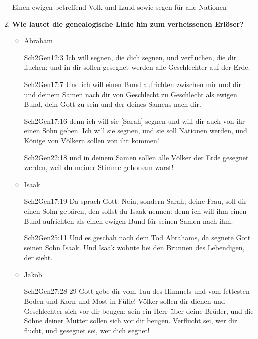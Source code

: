 \begin{enumerate}
        Einen ewigen betreffend Volk und Land sowie segen für alle Nationen
    \item \textbf{Wie lautet die genealogische Linie hin zum verheissenen Erlöser?}
    \begin{itemize}
        \item Abraham
         \begin{bibeltext}{Sch2}{Gen}{12:3}
            Ich will segnen, die  dich segnen, und verfluchen, die dir fluchen: und in dir sollen gesegnet werden alle Geschlechter auf der Erde.
        \end{bibeltext}
        \begin{bibeltext}{Sch2}{Gen}{17:7}
            Und ich will einen Bund aufrichten zwischen mir und dir und deinem Samen nach dir von Geschlecht zu Geschlecht als ewigen Bund, dein Gott zu sein und der deines Samens nach dir. 
        \end{bibeltext}
        \begin{bibeltext}{Sch2}{Gen}{17:16}
            denn ich will sie [Sarah] segnen und will dir auch von ihr einen Sohn geben. Ich will sie segnen, und sie soll Nationen werden, und Könige von Völkern sollen von ihr kommen!
        \end{bibeltext}
        \begin{bibeltext}{Sch2}{Gen}{22:18}
            und in deinem Samen sollen alle Völker der Erde gesegnet werden, weil du meiner Stimme gehorsam warst!
        \end{bibeltext}
        \item Isaak
        \begin{bibeltext}{Sch2}{Gen}{17:19}
            Da sprach Gott: Nein, sondern Sarah, deine Frau, soll dir einen Sohn gebären, den sollst du Isaak nennen: denn ich will ihm einen Bund aufrichten als einen ewigen Bund für seinen Samen nach ihm.
        \end{bibeltext}
        \begin{bibeltext}{Sch2}{Gen}{25:11}
            Und es geschah nach dem Tod Abrahams, da segnete Gott seinen Sohn Isaak. Und Isaak wohnte bei den \glqq Brunnen des Lebendigen, der sieht\grqq.
        \end{bibeltext}
        \item Jakob
        \begin{bibeltext}{Sch2}{Gen}{27:28-29}
            Gott gebe dir vom Tau des Himmels und vom fettesten Boden und Korn und Most in Fülle! Völker sollen dir dienen und Geschlechter sich vor dir beugen; sein ein Herr über deine Brüder, und die Söhne deiner Mutter sollen sich vor dir beugen. Verflucht sei, wer dir flucht, und gesegnet sei, wer dich segnet!

\end{bibeltext}
\end{itemize}
\end{enumerate}
